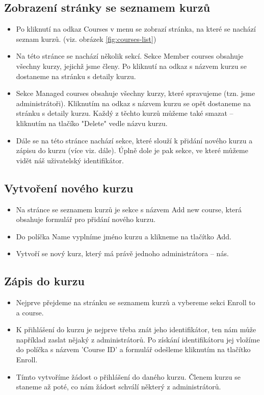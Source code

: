\subsection{Zobrazení stránky se seznamem kurzů}

\begin{itemize}
	\item Po kliknutí na odkaz Courses v menu se zobrazí stránka, na které se nachází seznam kurzů. (viz. obrázek \ref{fig:courses-list})
	\item Na této stránce se nachází několik sekcí. Sekce Member courses obsahuje všechny kurzy, jejichž jsme členy. Po kliknutí na odkaz s názvem kurzu se dostaneme na stránku s detaily kurzu.
	\item Sekce Managed courses obsahuje všechny kurzy, které spravujeme (tzn. jsme administrátoři). Kliknutím na odkaz s názvem kurzu se opět dostaneme na stránku s detaily kurzu. Každý z těchto kurzů můžeme také smazat -- kliknutím na tlačíko "Delete" vedle názvu kurzu.
	\item Dále se na této stránce nachází sekce, které slouží k přidání nového kurzu a zápisu do kurzu (více viz. dále). Úplně dole je pak sekce, ve které můžeme vidět náš uživatelský identifikátor.
\end{itemize}

\subsection{Vytvoření nového kurzu}

\begin{itemize}
	\item Na stránce se seznamem kurzů je sekce s názvem Add new course, která obsahuje formulář pro přidání nového kurzu.
	\item Do políčka Name vyplníme jméno kurzu a klikneme na tlačítko Add.
	\item Vytvoří se nový kurz, který má právě jednoho administrátora -- nás.
\end{itemize}

\subsection{Zápis do kurzu}

\begin{itemize}
	\item Nejprve přejdeme na stránku se seznamem kurzů a vybereme sekci Enroll to a course.
	\item K přihlášení do kurzu je nejprve třeba znát jeho identifikátor, ten nám může například zaslat nějaký z administrátorů. Po získání identifikátoru jej vložíme do políčka s názvem 'Course ID' a formulář odešleme kliknutím na tlačítko Enroll.
	\item Tímto vytvoříme žádost o přihlášení do daného kurzu. Členem kurzu se staneme až poté, co nám žádost schválí některý z administrátorů.
\end{itemize}

